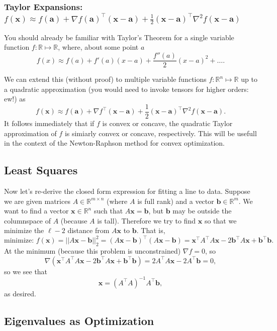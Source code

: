 \documentclass{article}
\newcommand{\1}{\mathbf{1}}
\newcommand{\0}{\mathbf{0}}
\newcommand{\xx}{\mathbf{x}}
\renewcommand{\aa}{\mathbf{a}}
\newcommand{\bb}{\mathbf{b}}
\newcommand{\RR}{\mathbb{R}}
\renewcommand{\aa}{\mathbf{a}}
\newcommand{\T}{\top}
\begin{document}
\subsubsection{Taylor Expansions: $f(\xx) \approx f(\aa) + \nabla f(\aa)^\T (\xx-\aa) + \frac{1}{2}(\xx-\aa)^\T \nabla^2 f (\xx-\aa)$}

You should already be familiar with Taylor's Theorem for a single variable function
$f : \RR \mapsto \RR$, where, about some point $a$
\[
    f(x) \approx f(a) + f'(a)(x-a) + \frac{f''(a)}{2}(x-a)^2 + \dots.
\]

We can extend this (without proof) to multiple variable functions
$f : \RR^n \mapsto \RR$ up to a quadratic approximation (you would need
to invoke tensors for higher orders: ew!) as
\[
    f(\xx) \approx f(\aa) + \nabla f^\T(\xx-\aa) + \frac{1}{2}(\xx-\aa)^\T \nabla^2 f (\xx-\aa).
\]
It follows immediately that if $f$ is convex or concave, the quadratic
Taylor approximation of $f$ is simiarly convex or concave, respectively.
This will be usefull in the context of the Newton-Raphson method for
convex optimization.

\subsection{Least Squares}

Now let's re-derive the closed form expression for fitting a line
to data. Suppose we are given matrices $A\in\RR^{m\times n}$ (where
$A$ is full rank) and a vector $\bb\in\RR^m$. We want to find a vector
$\xx\in\RR^n$ such that $A\xx=\bb$, but $\bb$ may be outside the
columnspace of $A$ (because $A$ is tall). Therefore we try to find
$\xx$ so that we minimize the $\ell-2$ distance from $A\xx$ to $\bb$.
That is,
\[
    \text{minimize: } f(\xx) = ||A\xx - \bb||_2^2 = (A\xx - \bb)^\T(A\xx-\bb) = \xx^\T A^\T A\xx - 2\bb^\T A\xx + \bb^\T\bb.
\]
At the minimum (because this problem is unconstrained) $\nabla f = 0$, so
\[
    \nabla \left(\xx^\T A^\T A\xx - 2\bb^\T A\xx + \bb^\T\bb\right) = 2A^\T A\xx - 2A^\T \bb = 0,
\]
so we see that
\[
    \xx = (A^\T A)^{-1}A^\T\bb,
\]
as desired.

\subsection{Eigenvalues as Optimization}
\end{document}
